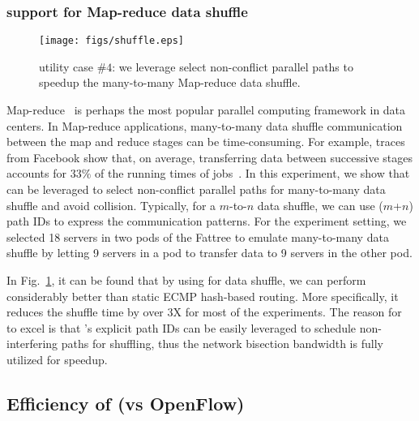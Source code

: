 \subsubsection{\sys support for Map-reduce data shuffle}

\begin{figure}[t]
\centering
\texttt{[image: figs/shuffle.eps]}
\caption{\sys utility case $\#4$: we leverage \sys select non-conflict parallel paths to speedup the many-to-many Map-reduce data shuffle.} \label{fig:shuffle}
\end{figure}

Map-reduce~\cite{mapreduce} is perhaps the most popular parallel computing framework in data centers. In Map-reduce applications, many-to-many data shuffle communication between the map and reduce stages can be time-consuming. For example, traces from Facebook show that, on average, transferring data between successive stages accounts for $33\%$ of the running times of jobs~\cite{orchestra}. In this experiment, we show that \sys can be leveraged to select non-conflict parallel paths for many-to-many data shuffle and avoid collision. Typically, for a $m$-to-$n$ data shuffle, we can use ($m$+$n$) path IDs to express the communication patterns. For the experiment setting, we selected 18 servers in two pods of the Fattree to emulate many-to-many data shuffle by letting 9 servers in a pod to transfer data to 9 servers in the other pod.

In Fig.~\ref{fig:shuffle}, it can be found that by using \sys for data shuffle, we can perform considerably better than static ECMP hash-based routing. More specifically, it reduces the shuffle time by over 3X for most of the experiments. The reason for \sys to excel is that \sys's explicit path IDs can be easily leveraged to schedule non-interfering paths for shuffling, thus the network bisection bandwidth is fully utilized for speedup.



\subsection{Efficiency of \sys (vs OpenFlow)}\label{subsec:openflow}

